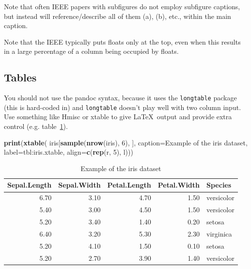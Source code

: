 \documentclass[a4paper,conference]{IEEEtran}
\newenvironment{Shaded}{\begin{snugshade}}{\end{snugshade}}
\newcommand{\AttributeTok}[1]{\textcolor[rgb]{0.13,0.29,0.53}{#1}}
\newcommand{\DecValTok}[1]{\textcolor[rgb]{0.00,0.00,0.81}{#1}}
\newcommand{\FunctionTok}[1]{\textcolor[rgb]{0.13,0.29,0.53}{\textbf{#1}}}
\newcommand{\NormalTok}[1]{#1}
\newcommand{\StringTok}[1]{\textcolor[rgb]{0.31,0.60,0.02}{#1}}
\begin{document}
Note that often IEEE papers with subfigures do not employ subfigure
captions, but instead will reference/describe all of them (a), (b),
etc., within the main caption.

Note that the IEEE typically puts floats only at the top, even when this
results in a large percentage of a column being occupied by floats.

\subsection{Tables}\label{sec:tables}

You should not use the pandoc syntax, because it uses the
\texttt{longtable} package (this is hard-coded in) and
\texttt{longtable} doesn't play well with two column input. Use
something like Hmisc or xtable to give \LaTeX~output and provide extra
control (e.g. table~\ref{tbl:iris.xtable}).

\begin{Shaded}
\begin{Highlighting}[]
\FunctionTok{print}\NormalTok{(}\FunctionTok{xtable}\NormalTok{(}
\NormalTok{  iris[}\FunctionTok{sample}\NormalTok{(}\FunctionTok{nrow}\NormalTok{(iris), }\DecValTok{6}\NormalTok{), ],}
  \AttributeTok{caption=}\StringTok{\textquotesingle{}Example of the iris dataset\textquotesingle{}}\NormalTok{,}
  \AttributeTok{label=}\StringTok{\textquotesingle{}tbl:iris.xtable\textquotesingle{}}\NormalTok{,}
  \AttributeTok{align=}\FunctionTok{c}\NormalTok{(}\FunctionTok{rep}\NormalTok{(}\StringTok{\textquotesingle{}r\textquotesingle{}}\NormalTok{, }\DecValTok{5}\NormalTok{), }\StringTok{\textquotesingle{}l\textquotesingle{}}\NormalTok{)))}
\end{Highlighting}
\end{Shaded}

\begin{table}[!t]
\centering
\caption{Example of the iris dataset} 
\label{tbl:iris.xtable}
\begin{tabular}{rrrrl}
  \hline
Sepal.Length & Sepal.Width & Petal.Length & Petal.Width & Species \\ 
  \hline
6.70 & 3.10 & 4.70 & 1.50 & versicolor \\ 
  5.40 & 3.00 & 4.50 & 1.50 & versicolor \\ 
  5.20 & 3.40 & 1.40 & 0.20 & setosa \\ 
  6.40 & 3.20 & 5.30 & 2.30 & virginica \\ 
  5.20 & 4.10 & 1.50 & 0.10 & setosa \\ 
  5.20 & 2.70 & 3.90 & 1.40 & versicolor \\ 
   \hline
\end{tabular}
\end{table}
\end{document}
